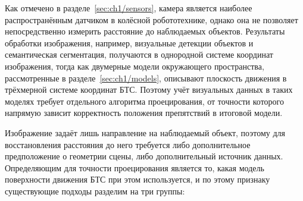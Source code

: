 Как отмечено в разделе~\cref{sec:ch1/sensors}, камера является наиболее распространённым датчиком в колёсной робототехнике, однако она не позволяет непосредственно измерить расстояние до наблюдаемых объектов. Результаты обработки изображения, например, визуальные детекции объектов и семантическая сегментация, получаются в однородной системе координат изображения, тогда как двумерные модели окружающего пространства, рассмотренные в разделе~\cref{sec:ch1/models}, описывают плоскость движения в трёхмерной системе координат БТС. Поэтому учёт визуальных данных в таких моделях требует отдельного алгоритма проецирования, от точности которого напрямую зависит корректность положения препятствий в итоговой модели.

Изображение задаёт лишь направление на наблюдаемый объект, поэтому для восстановления расстояния до него требуется либо дополнительное предположение о геометрии сцены, либо дополнительный источник данных. Определяющим для точности проецирования является то, какая модель поверхности движения БТС при этом используется, и по этому признаку существующие подходы разделим на три группы: 


